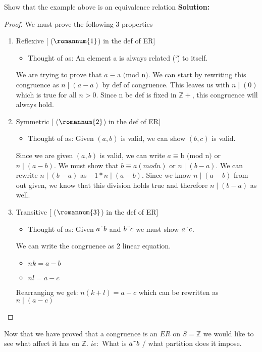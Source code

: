 \documentclass{article}
\newcounter{example}
\theoremstyle{definition}
\theoremstyle{claim}
\theoremstyle{remark}
\newcommand\TheSolution{%
  \textbf{Solution:}\\%
}
\begin{document}
\begin{flushleft}
Show that the example above is an equivalence relation
\newline \newline
\TheSolution 
\begin{proof}{}
We must prove the following 3 properties
\begin{enumerate}
  \item Reflexive [ ($\romannum{1}$) in the def of ER]
  \begin{itemize}
     \item Thought of as: An element a is always related (\char`\~) to itself.
   \end{itemize}
   We are trying to prove that $a \equiv\text{a (mod n)}$. We can start by rewriting this congruence as $n \mid (a-a)$ by def of congruence. This leaves us with $n \mid (0)$ which is true for all $n > 0$. Since n be def is fixed in $\mathbb{Z+}$, this congruence will always hold.
  \item Symmetric [ ($\romannum{2}$) in the def of ER]
    \begin{itemize}
     \item Thought of as: Given $(a, b)$ is valid, we can show $(b, c)$ is valid.
    \end{itemize}
   Since we are given $(a, b)$ is valid, we can write $a \equiv \text{b (mod n)}$ or $n \mid (a-b)$. We must show that $b \equiv a (mod n)$ or $n \mid (b-a)$.
   We can rewrite $n \mid (b-a)$ as $-1 * n \mid (a-b)$. Since we know $n \mid (a-b)$ from out given, we know that this division holds true and therefore $n \mid (b-a)$ as well. 
  \item Transitive [ ($\romannum{3}$) in the def of ER]
    \begin{itemize}
     \item Thought of as: Given $a \char`\~ b$ and $b \char`\~ c$ we must show $a \char`\~ c$.
   \end{itemize}
   We can write the congruence as 2 linear equation.
   \begin{itemize}
     \item $nk = a - b$
     \item $nl = a - c$
   \end{itemize}
   Rearranging we get: $n(k+l) = a - c$ which can be rewritten as $n \mid (a-c)$
\end{enumerate}
\end{proof}
Now that we have proved that a congruence is an $ER$ on $S = \mathbb{Z}$ we would like to see what affect it has on $\mathbb{Z}$. $ie:$ What is $a \char`\~ b$ / what partition does it impose.

\end{flushleft}
\end{document}
